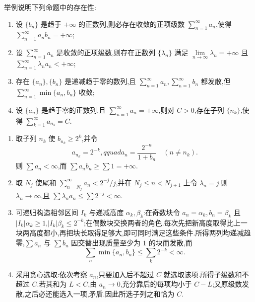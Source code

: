 \begin{example}[\markstar]
    举例说明下列命题中的存在性:
    \begin{enumerate}
        \item 设 $\{b_n\}$ 是趋于 $+\infty$ 的正数列,则必存在收敛的正项级数 $\displaystyle\sum\limits_{n=1}^{\infty}a_n$,使得 $\displaystyle\sum\limits_{n=1}^{\infty}a_nb_n=+\infty$;
        \item 设 $\displaystyle\sum\limits_{n=1}^{\infty}a_n$ 是收敛的正项级数,则存在正数列 $\{\lambda_n\}$ 满足 $\displaystyle\lim\limits_{n\to\infty}\lambda_n=+\infty$ 且 $\displaystyle\sum\limits_{n=1}^{\infty}\lambda_na_n<+\infty$;
        \item 存在 $\{a_n\},\{b_n\}$ 是递减趋于零的数列,且 $\displaystyle\sum\limits_{n=1}^{\infty}a_n,\sum\limits_{n=1}^{\infty}b_n$ 都发散,但 $\displaystyle\sum\limits_{n=1}^{\infty}\min\{a_n,b_n\}$ 收敛;
        \item 设 $\{a_n\}$ 是趋于零的正数列,且 $\displaystyle\sum\limits_{n=1}^{\infty}a_n=+\infty$,则对 $C>0$,存在子列 $\{n_k\}$,使得 $\displaystyle\sum\limits_{k=1}^{\infty}a_{n_k}=C$.
    \end{enumerate}
\end{example}
\exampleblank

\begin{solution}
    \leavevmode
    \begin{enumerate}
        \item 取子列 $n_k$ 使 $b_{n_k}\geq2^k$,并令
              \[
                  a_{n_k}=2^{-k},qquad
                  a_n=\dfrac{2^{-n}}{1+b_n}\quad(n\neq n_k).
              \]
              则 $\displaystyle \sum a_n<\infty$,而 $\displaystyle \sum a_nb_n\geq\sum 1=+\infty$.
        \item 取 $N_j$ 使尾和 $\displaystyle \sum_{n=N_j}^{\infty}a_n<2^{-j}/j$,并在
              $N_j\leq n<N_{j+1}$ 上令 $\lambda_n=j$.则 $\lambda_n\to\infty$,且
              $\displaystyle \sum\lambda_na_n\leq\sum2^{-j}<\infty$.
        \item 可递归构造相邻区间 $I_k$ 与递减高度 $\alpha_k,\beta_k$:在奇数块令
              $a_n=\alpha_k,b_n=\beta_k$ 且 $|I_k|\alpha_k\geq1$,$|I_k|\beta_k\leq2^{-k}$;在偶数块交换两者的角色.每次先把新高度取得比上一块两高度都小,再把块长取得足够大,即可同时满足这些条件.所得两列均递减趋零,$\displaystyle \sum a_n$ 与 $\displaystyle \sum b_n$ 因交替出现质量至少为 $1$ 的块而发散,而
              \[
                  \displaystyle\sum\limits_n\min\{a_n,b_n\}\leq\sum\limits_k2^{-k}<\infty.
              \]
        \item 采用贪心选取:依次考察 $a_n$,只要加入后不超过 $C$ 就选取该项.所得子级数和不超过 $C$.若其和为 $L<C$,由 $a_n\to0$,充分靠后的每项均小于 $C-L$;又原级数发散,之后必还能选入一项,矛盾.因此所选子列之和恰为 $C$.
    \end{enumerate}
\end{solution}

